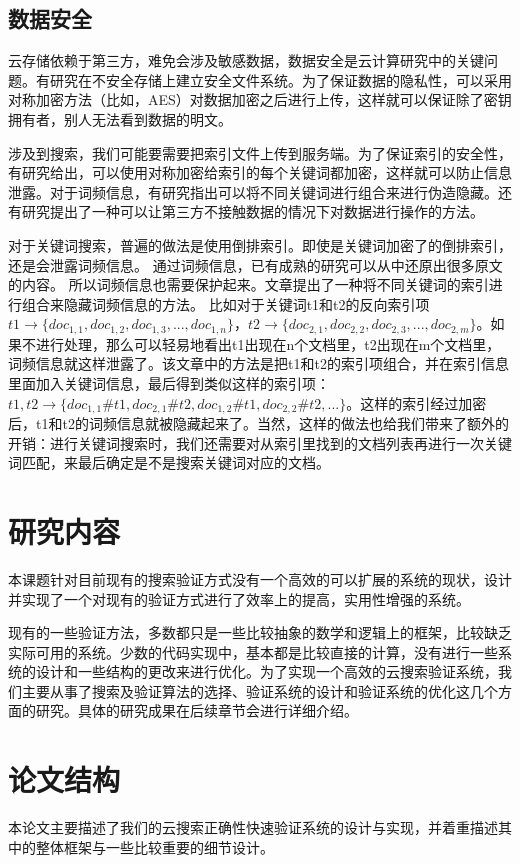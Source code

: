 \subsection{数据安全}
云存储依赖于第三方，难免会涉及敏感数据，数据安全是云计算研究中的关键问题。有研究在不安全存储上建立安全文件系统。为了保证数据的隐私性，可以采用对称加密方法（比如，AES）对数据加密之后进行上传，这样就可以保证除了密钥拥有者，别人无法看到数据的明文。

涉及到搜索，我们可能要需要把索引文件上传到服务端。为了保证索引的安全性，有研究给出，可以使用对称加密给索引的每个关键词都加密，这样就可以防止信息泄露。对于词频信息，有研究指出可以将不同关键词进行组合来进行伪造隐藏。还有研究提出了一种可以让第三方不接触数据的情况下对数据进行操作的方法。

对于关键词搜索，普遍的做法是使用倒排索引。即使是关键词加密了的倒排索引，还是会泄露词频信息。
通过词频信息，已有成熟的研究可以从中还原出很多原文的内容。
所以词频信息也需要保护起来。文章\cite{zerr2008zerber}提出了一种将不同关键词的索引进行组合来隐藏词频信息的方法。
比如对于关键词t1和t2的反向索引项$t1 \to \{doc_{1,1},doc_{1,2},doc_{1,3},...,doc_{1,n}\}$，$t2 \to \{doc_{2,1},doc_{2,2},doc_{2,3},...,doc_{2,m}\}$。如果不进行处理，那么可以轻易地看出t1出现在n个文档里，t2出现在m个文档里，词频信息就这样泄露了。该文章中的方法是把t1和t2的索引项组合，并在索引信息里面加入关键词信息，最后得到类似这样的索引项：$t1,t2 \to \{doc_{1,1}\#t1,doc_{2,1}\#t2,doc_{1,2}\#t1,doc_{2,2}\#t2,...\}$。这样的索引经过加密后，t1和t2的词频信息就被隐藏起来了。当然，这样的做法也给我们带来了额外的开销：进行关键词搜索时，我们还需要对从索引里找到的文档列表再进行一次关键词匹配，来最后确定是不是搜索关键词对应的文档。

\section{研究内容}
本课题针对目前现有的搜索验证方式没有一个高效的可以扩展的系统的现状，设计并实现了一个对现有的验证方式进行了效率上的提高，实用性增强的系统。

现有的一些验证方法，多数都只是一些比较抽象的数学和逻辑上的框架，比较缺乏实际可用的系统。少数的代码实现中，基本都是比较直接的计算，没有进行一些系统的设计和一些结构的更改来进行优化。为了实现一个高效的云搜索验证系统，我们主要从事了搜索及验证算法的选择、验证系统的设计和验证系统的优化这几个方面的研究。具体的研究成果在后续章节会进行详细介绍。

\section{论文结构}
本论文主要描述了我们的云搜索正确性快速验证系统的设计与实现，并着重描述其中的整体框架与一些比较重要的细节设计。

